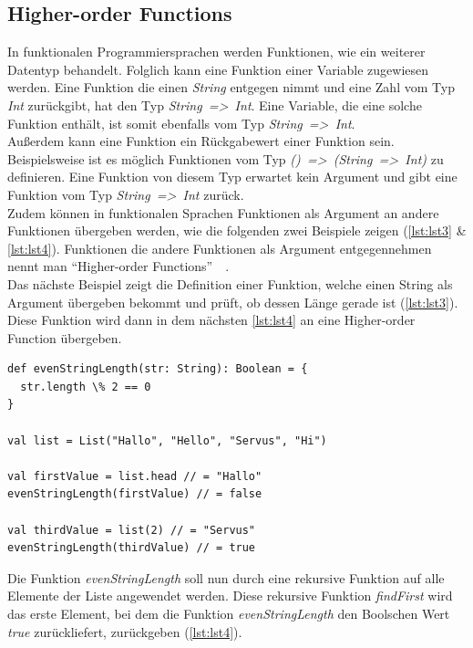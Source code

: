 \pagebreak

\subsection{Higher-order Functions}
In funktionalen Programmiersprachen werden Funktionen, wie ein weiterer Datentyp behandelt. Folglich kann eine Funktion einer Variable zugewiesen werden. Eine Funktion die einen \textit{String} entgegen nimmt und eine Zahl vom Typ \textit{Int} zurückgibt, hat den Typ \textit{String~=>~Int}. Eine Variable, die eine solche Funktion enthält, ist somit ebenfalls vom Typ \textit{String~=>~Int}.\\
Außerdem kann eine Funktion ein Rückgabewert einer Funktion sein. Beispielsweise ist es möglich Funktionen vom Typ \textit{()~=>~(String~=>~Int)} zu definieren. Eine Funktion von diesem Typ erwartet kein Argument und gibt eine Funktion vom Typ \textit{String~=>~Int} zurück.\\
Zudem können in funktionalen Sprachen Funktionen als Argument an andere Funktionen übergeben werden, wie die folgenden zwei Beispiele zeigen (\autoref{lst:lst3} \& \ref{lst:lst4}). Funktionen die andere Funktionen als Argument entgegennehmen nennt man \enquote{Higher-order Functions}~\cite[S.~50]{butcher_seven_2014}~\cite[S.~3~\&~S.~19]{chiusano_functional_2015}.\\
Das nächste Beispiel zeigt die Definition einer Funktion, welche einen String als Argument übergeben bekommt und prüft, ob dessen Länge gerade ist (\ref{lst:lst3}). Diese Funktion wird dann in dem nächsten \autoref{lst:lst4} an eine Higher-order Function übergeben.

\begin{lstlisting}[caption={Funktion, welche prüft, ob die Länge eines Strings gerade ist.},label={lst:lst3}]
def evenStringLength(str: String): Boolean = {
  str.length \% 2 == 0
}

val list = List("Hallo", "Hello", "Servus", "Hi")

val firstValue = list.head // = "Hallo"
evenStringLength(firstValue) // = false

val thirdValue = list(2) // = "Servus"
evenStringLength(thirdValue) // = true
\end{lstlisting}

\pagebreak

Die Funktion \textit{evenStringLength} soll nun durch eine rekursive Funktion auf alle Elemente der Liste angewendet werden. Diese rekursive Funktion \textit{findFirst} wird das erste Element, bei dem die Funktion \textit{evenStringLength} den Boolschen Wert \textit{true} zurückliefert, zurückgeben (\ref{lst:lst4}).
  
